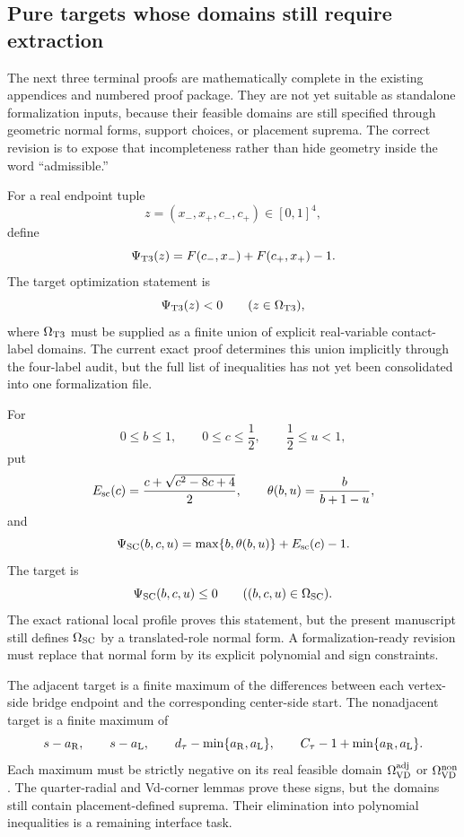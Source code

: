 \subsection{Pure targets whose domains still require extraction}

The next three terminal proofs are mathematically complete in the existing
appendices and numbered proof package.  They are not yet suitable as
standalone formalization inputs, because their feasible domains are still
specified through geometric normal forms, support choices, or placement
suprema.  The correct revision is to expose that incompleteness rather than
hide geometry inside the word ``admissible.''

\begin{definition}
\label{prob:s2-t3-endpoint}
For a real endpoint tuple
\[
 z=(x_-,x_+,c_-,c_+)\in[0,1]^4,
\]
define
\[
 \Psi_{\rm T3}(z)=F(c_-,x_-)+F(c_+,x_+)-1.
\]
The target optimization statement is
\[
 \Psi_{\rm T3}(z)<0
 \qquad(z\in\Omega_{\rm T3}),
\]
where $\Omega_{\rm T3}$ must be supplied as a finite union of explicit
real-variable contact-label domains.  The current exact proof determines this
union implicitly through the four-label audit, but the full list of
inequalities has not yet been consolidated into one formalization file.
\end{definition}

\begin{definition}
\label{prob:s2-rescuer}
For
\[
 0\le b\le1,\qquad
 0\le c\le\frac12,\qquad
 \frac12\le u<1,
\]
put
\[
 E_{\rm sc}(c)=\frac{c+\sqrt{c^2-8c+4}}2,
 \qquad
 \theta(b,u)=\frac{b}{b+1-u},
\]
and
\[
 \Psi_{\rm SC}(b,c,u)
 =
 \max\{b,\theta(b,u)\}+E_{\rm sc}(c)-1.
\]
The target is
\[
 \Psi_{\rm SC}(b,c,u)\le0
 \qquad((b,c,u)\in\Omega_{\rm SC}).
\]
The exact rational local profile proves this statement, but the present
manuscript still defines $\Omega_{\rm SC}$ by a translated-role normal form.
A formalization-ready revision must replace that normal form by its explicit
polynomial and sign constraints.
\end{definition}

\begin{definition}
\label{prob:s2-vd-terminal}
The adjacent target is a finite maximum of the differences between each
vertex-side bridge endpoint and the corresponding center-side start.  The
nonadjacent target is a finite maximum of
\[
 s-a_{\rm R},\qquad
 s-a_{\rm L},\qquad
 d_\tau-\min\{a_{\rm R},a_{\rm L}\},\qquad
 C_\tau-1+\min\{a_{\rm R},a_{\rm L}\}.
\]
Each maximum must be strictly negative on its real feasible domain
$\Omega_{\rm VD}^{\rm adj}$ or $\Omega_{\rm VD}^{\rm non}$.  The quarter-radial
and Vd-corner lemmas prove these signs, but the domains still contain
placement-defined suprema.  Their elimination into polynomial inequalities
is a remaining interface task.
\end{definition}

